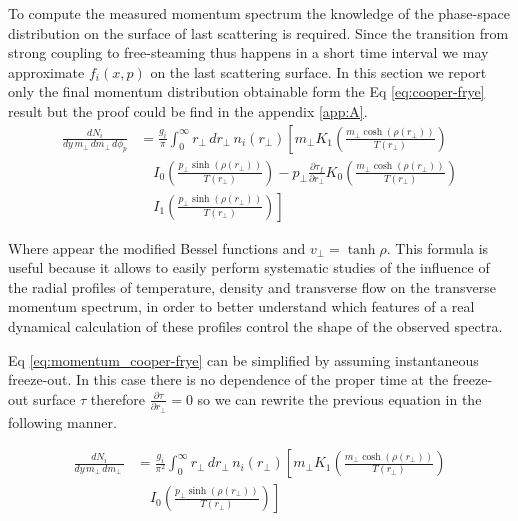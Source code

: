 \documentclass[12pt,a4paper]{book}
\begin{document}
	To compute the measured momentum spectrum the knowledge of the phase-space distribution on the surface of last scattering is required. Since the transition from strong coupling to free-steaming thus happens in a short time interval we may approximate $f_i(x, p)$ on the last scattering surface. In this section we report only the final momentum distribution obtainable form the Eq \ref{eq:cooper-frye} result but the proof could be find in the appendix \ref{app:A}.
	\begin{equation}
		\begin{aligned}
			\frac{dN_i}{dy \, m_\perp \, dm_\perp \, d\phi_p} &= \frac{g_i}{\pi} \int_{0}^{\infty} r_\perp \, dr_\perp \, n_i(r_\perp) \left[ m_\perp K_1 \left( \frac{m_\perp \cosh(\rho(r_\perp))}{T(r_\perp)}\right) \right. \\
			& \quad \left. I_0 \left( \frac{p_\perp \sinh(\rho(r_\perp))}{T(r_\perp)} \right) - p_\perp \frac{\partial \tau_f}{\partial r_\perp} K_0 \left( \frac{m_\perp \cosh(\rho(r_\perp))}{T(r_\perp)}\right) \right. \\
			& \quad \left. I_1 \left( \frac{p_\perp \sinh(\rho(r_\perp))}{T(r_\perp)} \right) \right]
		\end{aligned}
		\label{eq:momentum_cooper-frye}
	\end{equation}
	
	Where appear the modified Bessel functions and $v_\perp= \tanh \rho$. This formula is useful because it allows to easily perform systematic studies of the influence of the radial profiles of temperature, density and transverse flow on the transverse momentum spectrum, in order to better understand which features of a real dynamical calculation of these profiles control the shape of the observed spectra.
	
	Eq \ref{eq:momentum_cooper-frye} can be simplified by assuming instantaneous freeze-out. In this case there is no dependence of the proper time at the freeze-out surface $\tau$ therefore $\frac{\partial \tau}{\partial r_\perp}=0$ so we can rewrite the previous equation in the following manner.
	
	\begin{equation}
		\begin{aligned}
			\frac{dN_i}{dy \, m_\perp \, dm_\perp \,} &= \frac{g_i}{\pi^2} \int_{0}^{\infty} r_\perp \, dr_\perp \, n_i(r_\perp) \left[ m_\perp K_1 \left( \frac{m_\perp \cosh(\rho(r_\perp))}{T(r_\perp)} \right) \right. \\
			&\quad \left. I_0 \left( \frac{p_\perp \sinh(\rho(r_\perp))}{T(r_\perp)} \right) \right]
		\end{aligned}
		\label{eq:BG_blast_wave}
	\end{equation}
	
\end{document}

